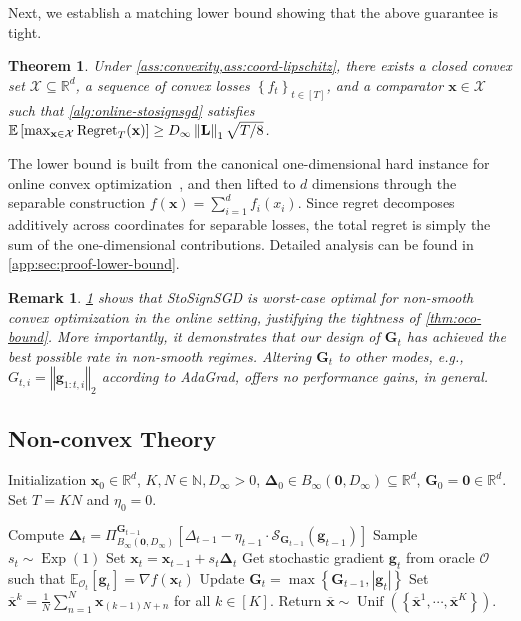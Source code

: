 \documentclass{article}
\newtheorem{thm}{Theorem}
\newtheorem{remark}{Remark}
\def \E {\mathbb{E}}
\def \x {\mathbf{x}}
\def \g {\mathbf{g}}
\def \O {\mathcal{O}}
\def \R {\mathbb{R}}
\def \SS {\mathcal{S}}
\def \Gb {\mathbf{G}}
\def \Lb {\mathbf{L}}
\def \xb {\overline{\x}}
\def \X {\mathcal{X}}
\def \N {\mathbb{N}}
\DeclareMathOperator*{\unif}{Unif}
\DeclareMathOperator*{\expdist}{Exp}
\newcommand{\norm}[1]{\left\Vert#1\right\Vert}
\newcommand{\abs}[1]{\left|#1\right|}
\def \bDelta {\bm{\Delta}}
\newcommand{\sqbrac}[1]{\left[#1\right]}
\newcommand{\brac}[1]{\left(#1\right)}
\newcommand{\cbrac}[1]{\left\{#1\right\}}
\def\0{\bm{0}}
\begin{document}
Next, we establish a matching lower bound showing that the above guarantee is tight.

\begin{thm}\label{thm:lower-bound}
    Under \cref{ass:convexity,ass:coord-lipschitz}, there exists a closed convex set $\X\subseteq\R^d$, a sequence of convex losses $\cbrac{f_t}_{t\in[T]}$, and a comparator $\x\in\X$ such that \cref{alg:online-stosignsgd} satisfies $\E\sqbrac{\max_{\x\in\X}\textnormal{Regret}_T(\x)}\ge D_\infty\norm{\Lb}_1\sqrt{T/8}$.




\end{thm}

The lower bound is built from the canonical one-dimensional hard instance for online convex optimization~\citep{orabona2019intro}, and then lifted to $d$ dimensions through the separable construction $f(\x)=\sum_{i=1}^d f_i(x_i)$. Since regret decomposes additively across coordinates for separable losses, the total regret is simply the sum of the one-dimensional contributions. Detailed analysis can be found in \cref{app:sec:proof-lower-bound}.

\begin{remark}\label{remark:lower-bound}
    \cref{thm:lower-bound} shows that StoSignSGD is worst-case optimal for non-smooth convex optimization in the online setting, justifying the tightness of \cref{thm:oco-bound}. More importantly, it demonstrates that our design of $\Gb_t$ has achieved the best possible rate in non-smooth regimes. Altering $\Gb_t$ to other modes, e.g., $G_{t,i}=\norm{\g_{1:t,i}}_2$ according to AdaGrad, offers no performance gains, in general.
\end{remark}



\subsection{Non-convex Theory\label{sec:non-convex-theory}}

\begin{algorithm}[t]
   \caption{Non-smooth Non-convex StoSignSGD}
   \label{alg:nonconvex-stosignsgd}
\begin{algorithmic}[1]
    Initialization $\x_0\in\R^d$, $K,N\in\N,D_\infty>0$, $\bDelta_0\in B_\infty(\0,D_\infty)\subseteq\R^d$, $\Gb_0=\0\in\R^d$.\\
   \STATE Set $T=KN$ and $\eta_0=0$.

   \STATE Compute $\bDelta_t=\Pi_{B_\infty(\0,D_\infty)}^{\Gb_{t-1}}\sqbrac{\Delta_{t-1}-\eta_{t-1}\cdot\SS_{\Gb_{t-1}}(\g_{t-1})}$  
   \STATE Sample $s_t\sim\expdist(1)$
   \STATE Set $\x_t=\x_{t-1}+s_t\bDelta_t$
   \STATE Get stochastic gradient $\g_t$ from oracle $\O$ such that $\E_{\O_t}[\g_t]=\nabla f(\x_t)$
   \STATE Update $\Gb_t=\max\cbrac{\Gb_{t-1},\abs{\g_t}}$
   \ENDFOR
   \STATE Set $\xb^k=\frac{1}{N}\sum_{n=1}^N\x_{(k-1)N+n}$ for all $k\in[K]$.
    Return $\xb\sim\unif\brac{\cbrac{\xb^1,\cdots,\xb^K}}$.
\end{algorithmic}
\end{algorithm}
\end{document}
